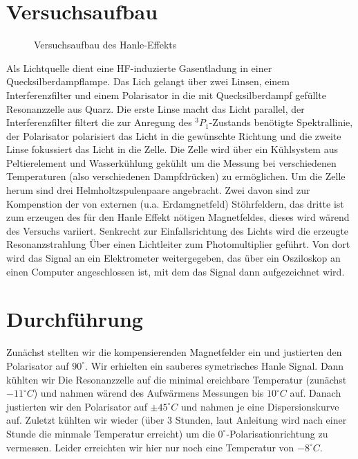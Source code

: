 \documentclass[12pt]{article}
\begin{document}
\section{Versuchsaufbau}
\begin{figure}[H]  
\centering
\caption{Versuchsaufbau des Hanle-Effekts}
\end{figure}

Als Lichtquelle dient eine HF-induzierte Gasentladung in einer Quecksilberdampflampe. Das Lich gelangt über zwei Linsen, 
einem Interferenzfilter und einem Polarisator in die mit Quecksilberdampf gefüllte Resonanzzelle aus Quarz. Die erste Linse 
macht das Licht parallel, der Interferenzfilter filtert die zur Anregung des $^3P_1$-Zustands benötigte Spektrallinie, der 
Polarisator polarisiert das Licht in die gewünschte Richtung und die zweite Linse fokussiert das Licht in die Zelle. Die Zelle
wird über ein Kühlsystem aus Peltierelement und Wasserkühlung gekühlt um die Messung bei verschiedenen Temperaturen (also
verschiedenen Dampfdrücken) zu ermöglichen. Um die Zelle herum sind drei Helmholtzspulenpaare angebracht. Zwei davon sind
zur Kompenstion der von externen (u.a. Erdamgnetfeld) Stöhrfeldern, das dritte ist zum erzeugen des für den Hanle Effekt 
nötigen Magnetfeldes, dieses wird wärend des Versuchs variiert. Senkrecht zur Einfallsrichtung des Lichts wird die erzeugte
Resonanzstrahlung Über einen Lichtleiter zum Photomultiplier geführt. Von dort wird das Signal an ein Elektrometer
weitergegeben, das über ein Osziloskop an einen Computer angeschlossen ist, mit dem das Signal dann aufgezeichnet wird.
\newpage

\section{Durchführung}
Zunächst stellten wir die kompensierenden Magnetfelder ein und justierten den Polarisator auf $90^\circ$. Wir erhielten
ein sauberes symetrisches Hanle Signal. Dann kühlten wir Die Resonanzzelle auf die minimal ereichbare Temperatur (zunächst
$-11^\circ C$) und nahmen wärend des Aufwärmens Messungen bis $10^\circ C$ auf. Danach justierten wir den Polarisator auf
$\pm 45^\circ C$ und nahmen je eine Dispersionskurve auf. Zuletzt kühlten wir wieder (über 3 Stunden, laut Anleitung wird
nach einer Stunde die minmale Temperatur erreicht) um die $0^\circ$-Polarisationrichtung zu vermessen. Leider erreichten
wir hier nur noch eine Temperatur von $-8^\circ C$. 
\end{document}
